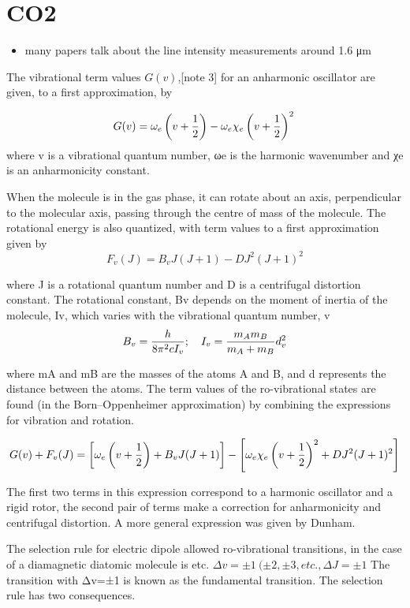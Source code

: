 \chapter{CO2}

\begin{itemize}

\item many papers talk about the line intensity measurements around 1.6 μm

\end{itemize}



The vibrational term values $G(v)$,[note 3] for an anharmonic oscillator are given, to a first approximation, by

\[{\displaystyle G(v)=\omega _{e}\left(v+{1 \over 2}\right)-\omega _{e}\chi _{e}\left(v+{1 \over 2}\right)^{2}\,}\]
where v is a vibrational quantum number, ωe is the harmonic wavenumber and χe is an anharmonicity constant.

When the molecule is in the gas phase, it can rotate about an axis, perpendicular to the molecular axis, passing through the centre of mass of the molecule. The rotational energy is also quantized, with term values to a first approximation given by
\[F_{v}(J)=B_{v}J\left(J+1\right)-DJ^{2}\left(J+1\right)^{2}\]

where J is a rotational quantum number and D is a centrifugal distortion constant. The rotational constant, Bv depends on the moment of inertia of the molecule, Iv, which varies with the vibrational quantum number, v
\[B_{v}={h \over {8\pi ^{2}cI_{v}}};\quad I_{v}={\frac  {m_{A}m_{B}}{m_{A}+m_{B}}}d_{v}^{2}\]

where mA and mB are the masses of the atoms A and B, and d represents the distance between the atoms. The term values of the ro-vibrational states are found (in the Born–Oppenheimer approximation) by combining the expressions for vibration and rotation.

\[{\displaystyle G(v)+F_{v}(J)=\left[\omega _{e}\left(v+{1 \over 2}\right)+B_{v}J(J+1)\right]-\left[\omega _{e}\chi _{e}\left(v+{1 \over 2}\right)^{2}+DJ^{2}(J+1)^{2}\right]}\]

The first two terms in this expression correspond to a harmonic oscillator and a rigid rotor, the second pair of terms make a correction for anharmonicity and centrifugal distortion. A more general expression was given by Dunham.

The selection rule for electric dipole allowed ro-vibrational transitions, in the case of a diamagnetic diatomic molecule is etc.
$ \Delta v=\pm 1\ (\pm 2,\pm 3,{\textit {etc.}},\Delta J=\pm 1$
The transition with Δv=±1 is known as the fundamental transition. The selection rule has two consequences.

